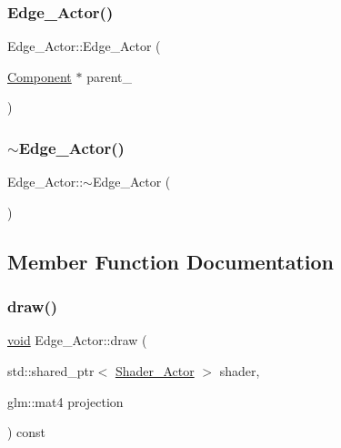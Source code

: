 \subsubsection{\texorpdfstring{Edge\+\_\+\+Actor()}{Edge\_Actor()}}
{\footnotesize\ttfamily Edge\+\_\+\+Actor\+::\+Edge\+\_\+\+Actor (\begin{DoxyParamCaption}\item[{\hyperlink{classComponent}{Component} $\ast$}]{parent\+\_\+ }\end{DoxyParamCaption})}

\mbox{\label{classEdge__Actor_aee2346e89a348a9725d43c6a11c697f8}} 
\subsubsection{\texorpdfstring{$\sim$\+Edge\+\_\+\+Actor()}{~Edge\_Actor()}}
{\footnotesize\ttfamily Edge\+\_\+\+Actor\+::$\sim$\+Edge\+\_\+\+Actor (\begin{DoxyParamCaption}{ }\end{DoxyParamCaption})}



\subsection{Member Function Documentation}
\mbox{\label{classEdge__Actor_a90887ba227fa0edf7cd7fdfd5d13f475}} 
\subsubsection{\texorpdfstring{draw()}{draw()}}
{\footnotesize\ttfamily \hyperlink{imgui__impl__opengl3__loader_8h_ac668e7cffd9e2e9cfee428b9b2f34fa7}{void} Edge\+\_\+\+Actor\+::draw (\begin{DoxyParamCaption}\item[{std\+::shared\+\_\+ptr$<$ \hyperlink{classShader__Actor}{Shader\+\_\+\+Actor} $>$}]{shader,  }\item[{glm\+::mat4}]{projection }\end{DoxyParamCaption}) const}

